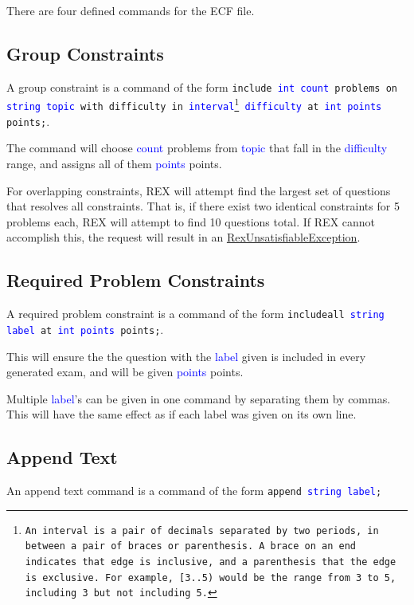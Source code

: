 \documentclass{article}
\begin{document}
There are four defined commands for the ECF file.

\subsection{Group Constraints}
A group constraint is a command of the form \texttt{include \textcolor{blue}{int count}
problems on \textcolor{blue}{string topic} with difficulty in \textcolor{blue}{interval\footnote{An interval is a pair of decimals separated by two periods, in between a pair of braces or parenthesis. A brace on an end indicates that edge is inclusive, and a parenthesis that the edge is exclusive. For example, \texttt{[3..5)} would be the range from 3 to 5, including 3 but not including 5.} difficulty} at \textcolor{blue}{int points} points;}.

The command will choose \textcolor{blue}{count} problems from \textcolor{blue}{topic} that fall in the \textcolor{blue}{difficulty} range, and assigns all of them \textcolor{blue}{points} points.

For overlapping constraints, REX will attempt find the largest set of questions that resolves all constraints. That is, if there exist two identical constraints for 5 problems each, REX will attempt to find 10 questions total. If REX cannot accomplish this, the request will result in an \hyperref[RexUnsatisfiableException]{RexUnsatisfiableException}. 

\subsection{Required Problem Constraints}
A required problem constraint is a command of the form \texttt{includeall \textcolor{blue}{string label} at \textcolor{blue}{int points} points;}.

This will ensure the the question with the \textcolor{blue}{label} given is included in every
generated exam, and will be given \textcolor{blue}{points} points. 

Multiple \textcolor{blue}{label}'s can be given in one command by separating them by commas. This will have the same effect as if each label was given on its own line.

\subsection{Append Text}
An append text command is a command of the form \texttt{append \textcolor{blue}{string label};}
\end{document}
